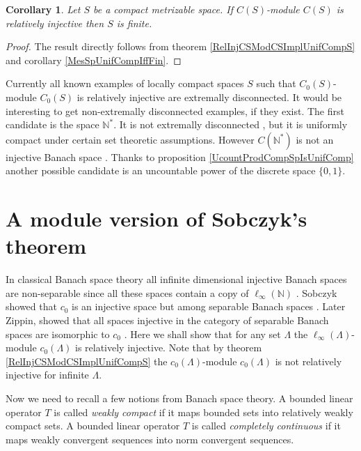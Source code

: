 \documentclass[12pt]{article}
\newtheorem{corollary}[theorem]{Corollary}
\begin{document}
\begin{corollary}\label{CSModCSRelInjImplSHasNoConvSeq} Let $S$ be a compact metrizable space. If $C(S)$-module $C(S)$ is relatively injective then $S$ is finite.
\end{corollary}
\begin{proof} The result directly follows from theorem \ref{RelInjCSModCSImplUnifCompS} and corollary  \ref{MesSpUnifCompIffFin}.
\end{proof}

Currently all known examples of locally compact spaces $S$ such that $C_0(S)$-module $C_0(S)$ is relatively injective are extremally disconnected. It would be interesting to get non-extremally disconnected examples, if they exist. The first candidate is the space $\mathbb{N}^*$. It is not extremally disconnected \cite[example 6.2.31]{EngkingGenTop}, but it is uniformly compact under certain set theoretic assumptions. However $C(\mathbb{N}^*)$ is not an injective Banach space \cite[corollary 2]{AmirProjContFuncSp}. Thanks to proposition \ref{UcountProdCompSpIsUnifComp} another possible candidate is an uncountable power of the discrete space $\{0, 1\}$.


\section{A module version of Sobczyk's theorem}
\label{SectionExamples}

In classical Banach space theory all infinite dimensional injective Banach spaces are non-separable since all these spaces contain a copy of $\ell_\infty(\mathbb{N})$ \cite[corollary 1.1.4]{RosOnRelDisjFamOfMeas}. Sobczyk showed that $c_0$ is an injective space but among separable Banach spaces \cite[theorem 5]{SobProjmOnc0}. Later Zippin, showed  that all spaces injective in the category of separable Banach spaces are isomorphic to $c_0$ \cite{ZipSepExtProbm}.  Here we shall show that for any set $\Lambda$ the $\ell_\infty(\Lambda)$-module $c_0(\Lambda)$ is relatively injective.
Note that by theorem \ref{RelInjCSModCSImplUnifCompS} the $c_0(\Lambda)$-module $c_0(\Lambda)$ is not relatively injective for infinite $\Lambda$.

Now we need to recall a few notions from Banach space theory. A bounded linear operator $T$ is called \textit{weakly compact} if it maps bounded sets into relatively weakly compact sets. A bounded linear operator $T$ is called \textit{completely continuous} if it maps weakly convergent sequences into norm convergent sequences.
\end{document}
